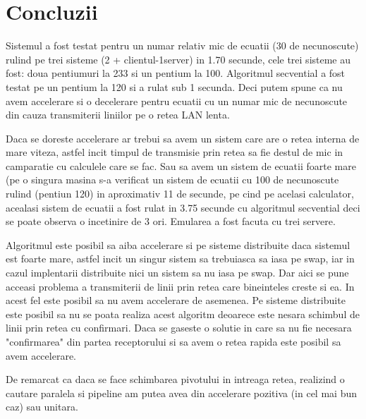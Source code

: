 \section{Concluzii}

\hspace{5mm}Sistemul a fost testat pentru un numar relativ mic de ecuatii
(30 de necunoscute) rulind pe trei sisteme (2 + clientul-1server) in 1.70
secunde, cele trei sisteme au fost: doua pentiumuri la 233 si un pentium la
100. Algoritmul secvential a fost testat pe un pentium la 120 si a rulat
sub 1 secunda. Deci putem spune ca nu avem accelerare si o decelerare pentru 
ecuatii cu un numar mic de necunoscute din cauza transmiterii liniilor pe o 
retea LAN lenta. 

Daca se doreste accelerare ar trebui sa avem un sistem care are o retea 
interna de mare viteza, astfel incit timpul de transmisie prin retea sa fie 
destul de mic in camparatie cu calculele care se fac. Sau sa avem un sistem 
de ecuatii foarte mare (pe o singura masina s-a verificat un sistem de ecuatii
 cu 100 de necunoscute rulind (pentiun 120) in aproximativ 11 de secunde, pe 
cind pe acelasi calculator, acealasi sistem de ecuatii a fost rulat in 3.75 secunde 
cu algoritmul secvential deci se poate observa o incetinire de 3 ori. Emularea
 a fost facuta cu trei servere.

Algoritmul este posibil sa aiba accelerare si pe sisteme distribuite daca
sistemul est foarte mare, astfel incit un singur sistem sa trebuiasca sa
iasa pe swap, iar in cazul implentarii distribuite nici un sistem sa nu iasa
pe swap. Dar aici se pune acceasi problema a transmiterii de linii prin retea
care bineinteles creste si ea. In acest fel este posibil sa nu avem
accelerare de asemenea. Pe sisteme distribuite este posibil sa nu se poata
realiza acest algoritm deoarece este nesara schimbul de linii prin retea cu
confirmari. Daca se gaseste o solutie in care sa nu fie necesara
"confirmarea" din partea receptorului si sa avem o retea rapida este posibil
sa avem accelerare.

De remarcat ca daca se face schimbarea pivotului in intreaga retea,
realizind o cautare paralela si pipeline am putea avea din accelerare
pozitiva (in cel mai bun caz) sau unitara.